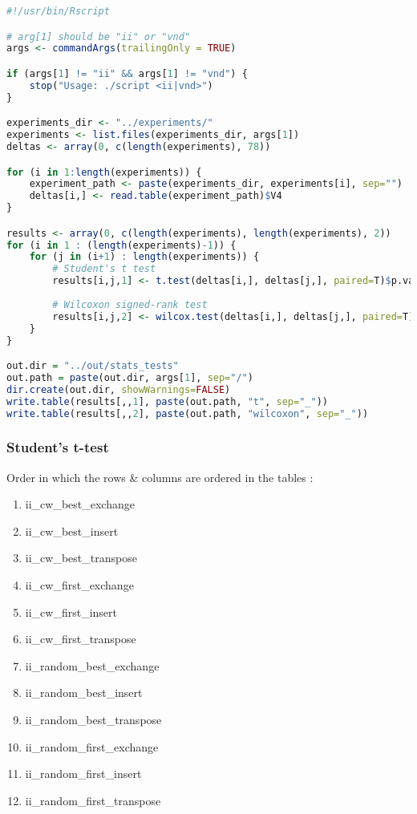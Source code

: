 \begin{lstlisting}[language=R]
#!/usr/bin/Rscript

# arg[1] should be "ii" or "vnd"
args <- commandArgs(trailingOnly = TRUE)

if (args[1] != "ii" && args[1] != "vnd") {
    stop("Usage: ./script <ii|vnd>")
}

experiments_dir <- "../experiments/"
experiments <- list.files(experiments_dir, args[1])
deltas <- array(0, c(length(experiments), 78))

for (i in 1:length(experiments)) {
    experiment_path <- paste(experiments_dir, experiments[i], sep="")
    deltas[i,] <- read.table(experiment_path)$V4
}

results <- array(0, c(length(experiments), length(experiments), 2))
for (i in 1 : (length(experiments)-1)) {
    for (j in (i+1) : length(experiments)) {
        # Student's t test
        results[i,j,1] <- t.test(deltas[i,], deltas[j,], paired=T)$p.value
        
        # Wilcoxon signed-rank test
        results[i,j,2] <- wilcox.test(deltas[i,], deltas[j,], paired=T)$p.value
    }
}

out.dir = "../out/stats_tests"
out.path = paste(out.dir, args[1], sep="/")
dir.create(out.dir, showWarnings=FALSE)
write.table(results[,,1], paste(out.path, "t", sep="_"))
write.table(results[,,2], paste(out.path, "wilcoxon", sep="_"))
\end{lstlisting}

\newpage

\subsubsection{Student's t-test}

\noindent Order in which the rows \& columns are ordered in the tables :

\begin{enumerate}
    \itemsep-0.5em
	\item ii\_cw\_best\_exchange
	\item ii\_cw\_best\_insert
	\item ii\_cw\_best\_transpose
	\item ii\_cw\_first\_exchange
	\item ii\_cw\_first\_insert
	\item ii\_cw\_first\_transpose
	\item ii\_random\_best\_exchange
	\item ii\_random\_best\_insert
	\item ii\_random\_best\_transpose
	\item ii\_random\_first\_exchange
	\item ii\_random\_first\_insert
	\item ii\_random\_first\_transpose
\end{enumerate}

